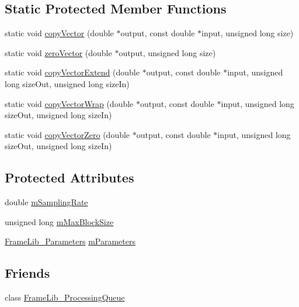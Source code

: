 \subsection*{Static Protected Member Functions}
\begin{DoxyCompactItemize}
\item 
static void \hyperlink{class_frame_lib___d_s_p_acd722a6a2939ed16f748288901f75119}{copy\+Vector} (double $\ast$output, const double $\ast$input, unsigned long size)
\item 
static void \hyperlink{class_frame_lib___d_s_p_a9da9216b727050afef88ff8e1ec01ba0}{zero\+Vector} (double $\ast$output, unsigned long size)
\item 
static void \hyperlink{class_frame_lib___d_s_p_a53100cc66147cbb05374e5d877ad4bd7}{copy\+Vector\+Extend} (double $\ast$output, const double $\ast$input, unsigned long size\+Out, unsigned long size\+In)
\item 
static void \hyperlink{class_frame_lib___d_s_p_a11ceb4866739ced35e33ce353d293130}{copy\+Vector\+Wrap} (double $\ast$output, const double $\ast$input, unsigned long size\+Out, unsigned long size\+In)
\item 
static void \hyperlink{class_frame_lib___d_s_p_aeb49d3b2882291b61acaefe1182f0e2e}{copy\+Vector\+Zero} (double $\ast$output, const double $\ast$input, unsigned long size\+Out, unsigned long size\+In)
\end{DoxyCompactItemize}
\subsection*{Protected Attributes}
\begin{DoxyCompactItemize}
\item 
double \hyperlink{class_frame_lib___d_s_p_ad638dccde211f80eedca3d898f2c6ff6}{m\+Sampling\+Rate}
\item 
unsigned long \hyperlink{class_frame_lib___d_s_p_a92c6d7101aee042e778fc8e09d5c8f77}{m\+Max\+Block\+Size}
\item 
\hyperlink{class_frame_lib___parameters}{Frame\+Lib\+\_\+\+Parameters} \hyperlink{class_frame_lib___d_s_p_a01fec01b8ecbf2a80b98f989a568105c}{m\+Parameters}
\end{DoxyCompactItemize}
\subsection*{Friends}
\begin{DoxyCompactItemize}
\item 
class \hyperlink{class_frame_lib___d_s_p_a71376d0a2e88daa0b12d080d6b5184a5}{Frame\+Lib\+\_\+\+Processing\+Queue}
\end{DoxyCompactItemize}
